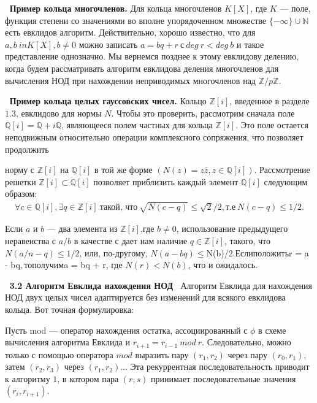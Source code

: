 \documentclass{../../template/mai_book}
\begin{document}
$\:$\newline
\noindent \textbf{Пример кольца многочленов.}
\newline \indent Для кольца многочленов $K[X]$, где $K$ — поле, функция степени со значениями во вполне упорядоченном множестве $\{-\infty\} \cup \mathds{N}$ есть евклидов алгоритм. Действительно, хорошо известно, что для $a,b \ in K[X], b \ne 0$ можно записать $a = bq + r\:с\:deg\:r < deg\:b$ и такое представление однозначно. Мы вернемся позднее к этому евклидову делению, когда будем рассматривать алгоритм евклидова деления многочленов для вычисления НОД при нахождении неприводимых многочленов над $\mathds{Z}/p\mathds{Z}$.

$\:$\newline
\noindent \textbf{Пример кольца целых гауссовских чисел.}
\newline \indent Кольцо $\mathds{Z}[i]$, введенное в разделе $1.3$, евклидово для нормы $N$. Чтобы это проверить, рассмотрим сначала поле $\mathds{Q}[i] = \mathds{Q} + i\mathds{Q}$, являющееся полем частных для кольца $\mathds{Z}[i]$. Это поле остается неподвижным относительно операции комплексного сопряжения, что позволяет продолжить

\newpage
\noindent норму с $\mathds{Z}[i]$ на $\mathds{Q}[i]$ в той же форме $(N(z) = z\bar{z}, z \in \mathds{Q}[i])$. Рассмотрение решетки $\mathds{Z}[i] \subset \mathds{Q}[i]$ позволяет приблизить каждый элемент $\mathds{Q}[i]$ следующим образом:
\begin{align*}
\forall c \in \mathds{Q}[i], \exists q \in \mathds{Z}[i]\:\text{такой, что}\: \sqrt{N(c-q)} \le \sqrt{2}/2,\text{т.е}\:N(c-q) \le 1/2\text{.}
\end{align*}

\noindent Если $a$ и $b$ — два элемента из $\mathds{Z}[i]$,где $b \ne 0$, использование предыдущего неравенства с $a/b$ в качестве с дает нам наличие $q \in \mathds{Z}[i]$, такого, что $N(a/n - q) \le 1/2$, или, по-другому, $N(a - bq) \le $N(b)/2$. Если положить $r = a - bq$, то получим $a = bq + r, где $N(r) < N(b)$, что и ожидалось.

$\:$ \newline
\textbf{\large 3.2 Алгоритм Евклида нахождения НОД}
$\:$ \newline
Алгоритм Евклида для нахождения НОД двух целых чисел адаптируется без изменений для всякого евклидова кольца. Вот точная формулировка:

\newpage
Пусть mod — оператор нахождения остатка, ассоциированный с $\phi$ в схеме вычисления алгоритма Евклида и $r_{i+1} = r_{i-1}\:mod\:r$. Следовательно, можно только с помощью оператора $mod$ выразить пару $(r_1,r_2)$ через пару $(r_0,r_1)$, затем $(r_2, r_3)$ через $(r_1, r_2)\dots$ Эта рекуррентная последовательность приводит к алгоритму $1$, в котором пара $(r, s)$ принимает последовательные значения $(r_i,r_{i+1})$.


\newpage
$\:$
\end{document}
